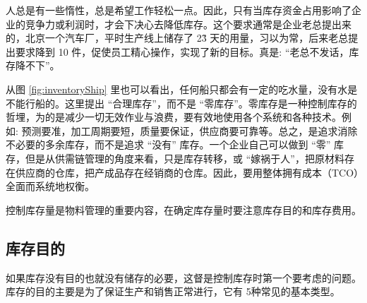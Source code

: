     人总是有一些惰性，总是希望工作轻松一点。因此，只有当库存资金占用影响了企业的竞争力或利润时，才会下决心去降低库存。这个要求通常是企业老总提出来的，北京一个汽车厂，平时生产线上储存了 2\~3 天的用量，习以为常，后来老总提出要求降到 10 件，促使员工精心操作，实现了新的目标。真是: “老总不发话，库存降不下”。

    从图 \ref{fig:inventoryShip} 里也可以看出，任何船只都会有一定的吃水量，没有水是不能行船的。这里提出 “合理库存”，而不是 “零库存”。零库存是一种控制库存的哲埋，为的是减少一切无效作业与浪费，要有效地使用各个系统和各种技术。例如: 预测要准，加工周期要短，质量要保证，供应商要可靠等。总之，是追求消除不必要的多余库存，而不是追求 “没有” 库存。一个企业自己可以做到 “零” 库存，但是从供需链管理的角度来看，只是库存转移，或 “嫁祸于人”，把原材料存在供应商的仓库，把产成品存在经销商的仓库。因此，要用整体拥有成本（TCO）全面而系统地权衡。

    控制库存量是物料管理的重要内容，在确定库存量时要注意库存目的和库存费用。

\subsection {库存目的}

    如果库存没有目的也就没有储存的必要，这督是控制库存时第一个要考虑的问题。库存的目的主要是为了保证生产和销售正常进行，它有 5种常见的基本类型。

